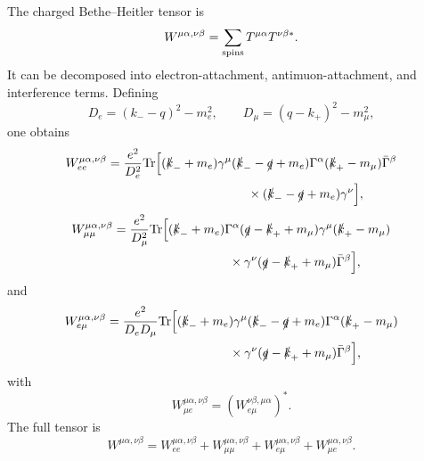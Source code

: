 \documentclass[
  aps,
  prl,
  twocolumn,
  superscriptaddress,
  amsmath, amssymb,
  floatfix, nofootinbib,
  longbibliography,
]{revtex4-2}
\newcommand{\mmu}{m_\mu}
\newcommand{\me}{m_e}
\newcommand{\Tr}{\mathrm{Tr}}
\begin{document}
The charged Bethe--Heitler tensor is
\begin{equation}
  W^{\mu\alpha,\nu\beta}
  =
  \sum_{\rm spins}T^{\mu\alpha}T^{\nu\beta *}.
\end{equation}
It can be decomposed into electron-attachment, antimuon-attachment,
and interference terms.  Defining
\begin{equation}
  D_e=(k_- -q)^2-\me^2,
  \qquad
  D_\mu=(q-k_+)^2-\mmu^2,
\end{equation}
one obtains
\begin{align}
  W_{ee}^{\mu\alpha,\nu\beta}
  ={}&
  \frac{e^2}{D_e^2}
  \Tr\Big[
  (\slashed k_-+\me)\gamma^\mu
  (\slashed k_- -\slashed q+\me)
  \Gamma^\alpha
  (\slashed k_+-\mmu)
  \bar\Gamma^\beta
  \nonumber\\
  &\hspace{3.5cm}\times
  (\slashed k_- -\slashed q+\me)
  \gamma^\nu
  \Big],
\label{eq:Wee}
\end{align}
\begin{align}
  W_{\mu\mu}^{\mu\alpha,\nu\beta}
  ={}&
  \frac{e^2}{D_\mu^2}
  \Tr\Big[
  (\slashed k_-+\me)
  \Gamma^\alpha
  (\slashed q-\slashed k_+ +\mmu)
  \gamma^\mu
  (\slashed k_+-\mmu)
  \nonumber\\
  &\hspace{2.8cm}\times
  \gamma^\nu
  (\slashed q-\slashed k_+ +\mmu)
  \bar\Gamma^\beta
  \Big],
\label{eq:Wmumu}
\end{align}
and
\begin{align}
  W_{e\mu}^{\mu\alpha,\nu\beta}
  ={}&
  \frac{e^2}{D_eD_\mu}
  \Tr\Big[
  (\slashed k_-+\me)\gamma^\mu
  (\slashed k_- -\slashed q+\me)
  \Gamma^\alpha
  (\slashed k_+-\mmu)
  \nonumber\\
  &\hspace{3.0cm}\times
  \gamma^\nu
  (\slashed q-\slashed k_+ +\mmu)
  \bar\Gamma^\beta
  \Big],
\label{eq:Wemu}
\end{align}
with
\begin{equation}
  W_{\mu e}^{\mu\alpha,\nu\beta}
  =
  \left(W_{e\mu}^{\nu\beta,\mu\alpha}\right)^*.
\end{equation}
The full tensor is
\begin{equation}
  W^{\mu\alpha,\nu\beta}
  =
  W_{ee}^{\mu\alpha,\nu\beta}
  +W_{\mu\mu}^{\mu\alpha,\nu\beta}
  +W_{e\mu}^{\mu\alpha,\nu\beta}
  +W_{\mu e}^{\mu\alpha,\nu\beta}.
\end{equation}
\end{document}
